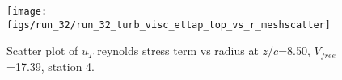 \begin{figure}[H]
\centering
\texttt{[image: figs/run\_32/run\_32\_turb\_visc\_ettap\_top\_vs\_r\_meshscatter]}
\caption{Scatter plot of $
u_T$ reynolds stress term vs radius at $z/c$=8.50, $V_{free}$=17.39, station 4.}
\label{fig:run_32_turb_visc_ettap_top_vs_r_meshscatter}
\end{figure}


